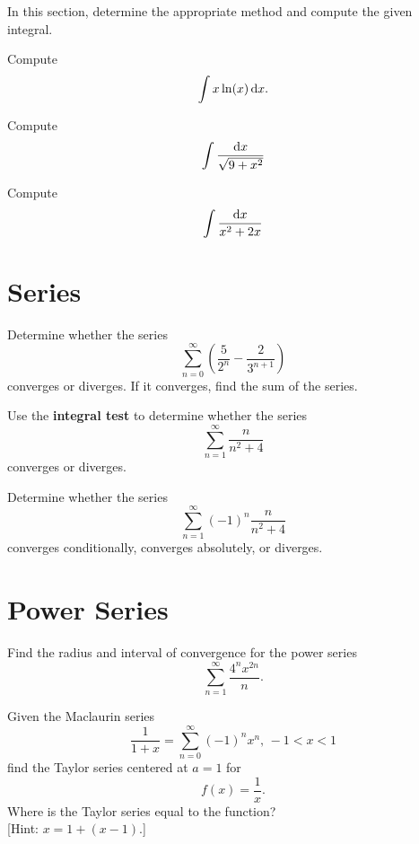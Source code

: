 \documentclass[12pt]{amsart}
\begin{document}
In this section, determine the appropriate method and compute the given integral.
\begin{thm}[10 Points]
  Compute
  \[\int x\ln(x)\dif x.\]
\end{thm}

\vspace{3in}

\begin{thm}[10 Points]
  Compute
  \[\int \frac{\dif x}{\sqrt{9 + x^2}}\]
\end{thm}

\newpage
\begin{thm}[10 Points]
Compute
\[\int \frac{\dif x}{x^2 + 2x}\]
\end{thm}

\newpage

\section{Series}

\begin{thm}[10 Points]
  Determine whether the series
  \[\sum_{n=0}^\infty \left(\frac{5}{2^n} - \frac{2}{3^{n+1}}\right)\]
  converges or diverges.
  If it converges, find the sum of the series.
\end{thm}

\newpage

\begin{thm}[10 Points]
  Use the \textbf{integral test} to determine whether the series
  \[\sum_{n=1}^\infty \frac{n}{n^2 + 4}\]
  converges or diverges.
\end{thm}

\vspace{3in}
\begin{thm}[10 Points]
  Determine whether the series
  \[\sum_{n=1}^\infty (-1)^n\frac{n}{n^2 + 4}\]
  converges conditionally, converges absolutely, or diverges.
\end{thm}

\newpage
\section{Power Series}
\begin{thm}[10 Points]
  Find the radius and interval of convergence for the power series
  \[\sum_{n=1}^\infty \frac{4^nx^{2n}}{n}.\]
\end{thm}

\newpage

\begin{thm}[10 Points]
  Given the Maclaurin series
  \[\frac{1}{1+x} = \sum_{n = 0}^\infty (-1)^n x^n,\, -1 < x < 1\]
  find the Taylor series centered at \(a = 1\) for 
  \[f(x) = \frac{1}{x}.\]
  Where is the Taylor series equal to the function?\\
  {[Hint: \(x = 1 + (x - 1)\).]}
\end{thm}
\end{document}
